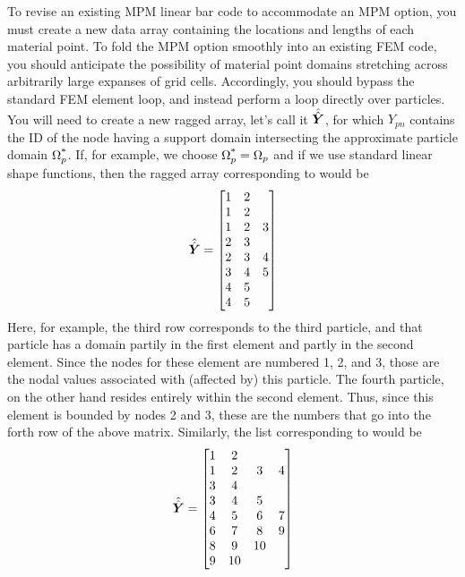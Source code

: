 To revise an existing MPM linear bar code to accommodate an MPM option, you must create a new data array containing the locations and lengths of each material point. To fold the MPM option smoothly into an existing FEM code, you should anticipate the possibility of material point domains stretching across arbitrarily large expanses of grid cells. Accordingly, you should bypass the standard FEM element loop, and instead perform a loop directly over particles. You will need to create a new ragged array, let's call it $\hat{\hat{\bm{Y}}}$, for which $Y_{pn}$ contains the ID of the \nth node having a support domain intersecting the approximate particle domain $\Omega_p^{\text{*}}$. If, for example, we choose $\Omega_p^{\text{*}}=\Omega_p$ and if we use standard linear shape functions, then the ragged array corresponding to  would be 
\begin{equation}
  \hat{\hat{\bm{Y}}}=\begin{bmatrix}1 & 2     \\ 
                            1 & 2     \\
                            1 & 2 & 3 \\
                            2 & 3     \\
                            2 & 3 & 4 \\
                            3 & 4 & 5 \\
                            4 & 5 \\
                            4 & 5
             \end{bmatrix}
\end{equation}
Here, for example, the third row corresponds to the third particle, and that particle has a domain partily in the first element and partly in the second element. Since the nodes for these element are numbered 1, 2, and 3, those are the nodal values associated with (\ie affected by) this particle. The fourth particle, on the other hand resides entirely within the second element. Thus, since this element is bounded by nodes 2 and 3, these are the numbers that go into the forth row of the above matrix.  Similarly, the list corresponding to  would be 
\begin{equation}
  \hat{\hat{\bm{Y}}}=\begin{bmatrix}1 & 2 \\ 
                            1 & 2 & 3 & 4 \\
                            3 & 4 \\
                            3 & 4 & 5 \\
                            4 & 5 & 6 & 7 \\
                            6 & 7 & 8 & 9 \\
                            8 & 9 & 10 \\
                            9 & 10
             \end{bmatrix}
\end{equation}



